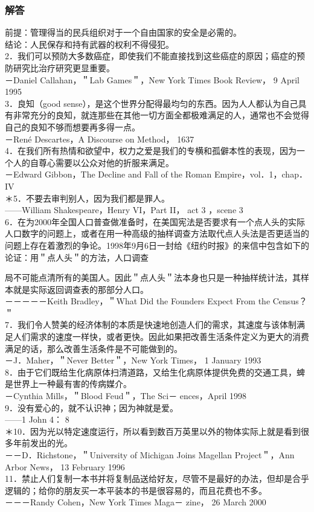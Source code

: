\subsubsection{解答}
前提：管理得当的民兵组织对于一个自由国家的安全是必需的。\\
结论：人民保存和持有武器的权利不得侵犯。\\
2．我们可以预防大多数癌症，即使我们不能直接找到这些癌症的原因；癌症的预防研究比治疗研究更显重要。\\
－Daniel Callahan，＂Lab Games＂，New York Times Book Review， 9 April 1995\\
3．良知（good sense），是这个世界分配得最均匀的东西。因为人人都认为自己具有非常充分的良知，就连那些在其他一切方面全都极难满足的人，通常也不会觉得自己的良知不够而想要再多得一点。\\
－René Descartes，A Discourse on Method， 1637\\
4．在我们所有热情和欲望中，权力之爱是我们的专横和孤僻本性的表现，因为一个人的自尊心需要以公众对他的折服来满足。\\
－Edward Gibbon，The Decline and Fall of the Roman Empire，vol．1，chap．IV\\
＊5．不要去审判别人，因为我们都是罪人。\\
——William Shakespeare，Henry VI，Part II， act 3 ，scene 3\\
6．在为2000年全国人口普查做准备时，在美国宪法是否要求有一个点人头的实际人口数字的问题上，或者在用一种高级的抽样调查方法取代点人头法是否更适当的问题上存在着激烈的争论。1998年9月6日一封给《纽约时报》的来信中包含如下的论证：用＂点人头＂的方法，人口调查

局不可能点清所有的美国人。因此＂点人头＂法本身也只是一种抽样统计法，其样本就是实际返回调查表的那部分人口。\\
－－－－－Keith Bradley，＂What Did the Founders Expect From the Census？＂\\
7．我们令人赞美的经济体制的本质是快速地创造人们的需求，其速度与该体制满足人们需求的速度一样快，或者更快。因此如果把改善生活条件定义为更大的消费满足的话，那么改善生活条件是不可能做到的。\\
－J．Maher，＂Never Better＂，New York Times， 1 January 1993\\
8．由于它们既给生化病原体扫清道路，又给生化病原体提供免费的交通工具，蜱是世界上一种最有害的传病媒介。\\
－Cynthia Mills，＂Blood Feud＂，The Sci－ ences，April 1998\\
9．没有爱心的，就不认识神；因为神就是爱。\\
——1 John 4： 8\\
＊10．因为光以特定速度运行，所以看到数百万英里以外的物体实际上就是看到很多年前发出的光。\\
－－D．Richstone，＂University of Michigan Joins Magellan Project＂，Ann Arbor News， 13 February 1996\\
11．禁止人们复制一本书并将复制品送给好友，尽管不是最好的办法，但却是合乎逻辑的；给你的朋友买一本平装本的书是很容易的，而且花费也不多。\\
－－－Randy Cohen，New York Times Maga－ zine， 26 March 2000

